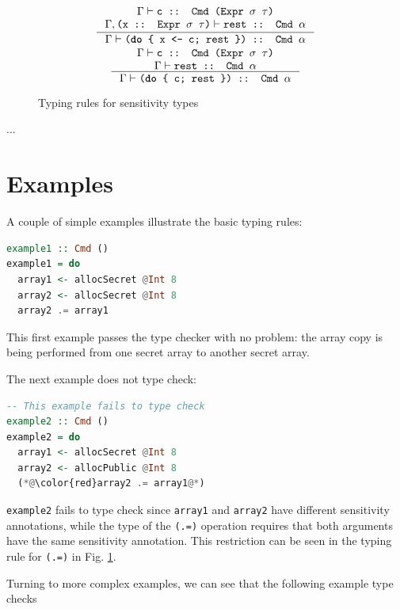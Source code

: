 \documentclass[10pt, conference]{IEEEtran}
\newcommand{\ttt}{\texttt}
\begin{document}
\begin{figure}
{\begin{minipage}{\linewidth}
\begin{gather*}
  \inference{%
    \Gamma \vdash \ttt{c :: Cmd (Expr $\sigma$ $\tau$)}
    \\ \Gamma,\ttt{(x :: Expr $\sigma$ $\tau$)} \vdash \ttt{rest :: Cmd $\alpha$}
  }{%
    \Gamma \vdash \ttt{(\textbf{do} \{ x <- c; rest \}) :: Cmd $\alpha$}
  }\\
  \inference{%
    \Gamma \vdash \ttt{c :: Cmd (Expr $\sigma$ $\tau$)}
    \\ \Gamma \vdash \ttt{rest :: Cmd $\alpha$}
  }{%
    \Gamma \vdash \ttt{(\textbf{do} \{ c; rest \}) :: Cmd $\alpha$}
  }
\end{gather*}
\end{minipage}}
  \caption{Typing rules for sensitivity types}
\label{fig:SensTypes}
\end{figure}

...

\section{Examples}
\label{sec:Examples}

A couple of simple examples illustrate the basic typing rules:

\begin{lstlisting}[language=haskell]
example1 :: Cmd ()
example1 = do
  array1 <- allocSecret @Int 8
  array2 <- allocSecret @Int 8
  array2 .= array1
\end{lstlisting}

\noindent This first example passes the type checker with no problem: the array copy
is being performed from one secret array to another secret array.

The next example does not type check:

\begin{lstlisting}[language=haskell]
  -- This example fails to type check
example2 :: Cmd ()
example2 = do
  array1 <- allocSecret @Int 8
  array2 <- allocPublic @Int 8
  (*@\color{red}array2 .= array1@*)
\end{lstlisting}

\noindent \ttt{example2} fails to type check since \ttt{array1} and \ttt{array2} have
different sensitivity annotations, while the type of the \ttt{(.=)} operation
requires that both arguments have the same sensitivity annotation. This restriction can
be seen in the typing rule for \ttt{(.=)} in Fig. \ref{fig:SensTypes}.

Turning to more complex examples, we can see that the following example type checks
\end{document}
